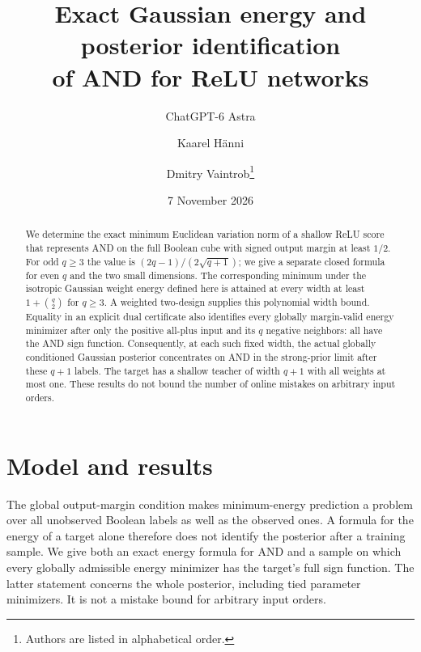 \documentclass[11pt]{article}
\title{Exact Gaussian energy and posterior identification\protect\\of AND for ReLU networks}
\author{ChatGPT-6 Astra \and Kaarel H\"anni \and Dmitry Vaintrob\thanks{Authors are listed in alphabetical order.}}
\date{7 November 2026}
\begin{document}
\maketitle

\begin{abstract}
We determine the exact minimum Euclidean variation norm of a shallow
ReLU score that represents AND on the full Boolean cube with signed
output margin at least $1/2$. For odd $q\ge3$ the value is
$(2q-1)/(2\sqrt{q+1})$; we give a separate closed formula for even $q$
and the two small dimensions. The corresponding minimum under the
isotropic Gaussian weight energy defined here is attained at every width
at least $1+\binom q2$ for $q\ge3$. A weighted two-design supplies this
polynomial width bound. Equality in an explicit dual certificate also
identifies every globally margin-valid energy minimizer after only the
positive all-plus input and its $q$ negative neighbors: all have the
AND sign function. Consequently, at each such fixed width, the actual
globally conditioned Gaussian posterior concentrates on AND in the
strong-prior limit after these $q+1$ labels. The target has a shallow
teacher of width $q+1$ with all weights at most one. These results do
not bound the number of online mistakes on arbitrary input orders.
\end{abstract}

\section{Model and results}

The global output-margin condition makes minimum-energy prediction a
problem over all unobserved Boolean labels as well as the observed
ones. A formula for the energy of a target alone therefore does not
identify the posterior after a training sample. We give both an exact
energy formula for AND and a sample on which every globally admissible
energy minimizer has the target's full sign function. The latter
statement concerns the whole posterior, including tied parameter
minimizers. It is not a mistake bound for arbitrary input orders.
\end{document}
